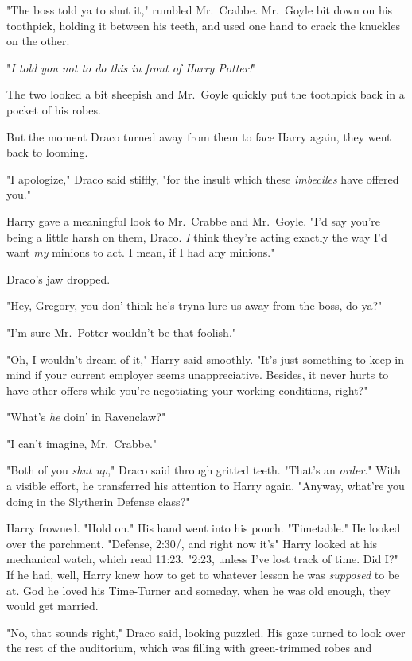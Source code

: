 "The boss told ya to shut it," rumbled Mr.~Crabbe. Mr.~Goyle bit down on his
toothpick, holding it between his teeth, and used one hand to crack the
knuckles on the other.

"\emph{I told you not to do this in front of Harry Potter!}"

The two looked a bit sheepish and Mr.~Goyle quickly put the toothpick back in a
pocket of his robes.

But the moment Draco turned away from them to face Harry again, they went back
to looming.

"I apologize," Draco said stiffly, "for the insult which these \emph{imbeciles}
have offered you."

Harry gave a meaningful look to Mr.~Crabbe and Mr.~Goyle. "I'd say you're being
a little harsh on them, Draco. \emph{I} think they're acting exactly the way
I'd want \emph{my} minions to act. I mean, if I had any minions."

Draco's jaw dropped.

"Hey, Gregory, you don' think he's tryna lure us away from the boss, do ya?"

"I'm sure Mr.~Potter wouldn't be that foolish."

"Oh, I wouldn't dream of it," Harry said smoothly. "It's just something to keep
in mind if your current employer seems unappreciative. Besides, it never hurts
to have other offers while you're negotiating your working conditions, right?"

"What's \emph{he} doin' in Ravenclaw?"

"I can't imagine, Mr.~Crabbe."

"Both of you \emph{shut up}," Draco said through gritted teeth. "That's an
\emph{order}." With a visible effort, he transferred his attention to Harry
again. "Anyway, what're you doing in the Slytherin Defense class?"

Harry frowned. "Hold on." His hand went into his pouch. "Timetable." He looked
over the parchment. "Defense, 2:30\PM/, and right now it's{\el}" Harry looked
at his mechanical watch, which read 11:23. "2:23, unless I've lost track of
time. Did I?" If he had, well, Harry knew how to get to whatever lesson he was
\emph{supposed} to be at. God he loved his Time-Turner and someday, when he was
old enough, they would get married.

"No, that sounds right," Draco said, looking puzzled. His gaze turned to look
over the rest of the auditorium, which was filling with green-trimmed robes
and{\el}


